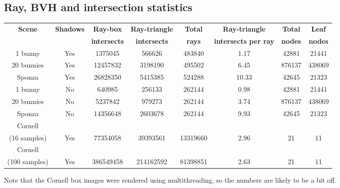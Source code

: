 \documentclass{article} %
\begin{document}
\subsection{Ray, BVH and intersection statistics}
\begin{tabular}{cccccccc}
{\bf Scene} & {\bf Shadows}       & {\bf Ray-box}    & {\bf Ray-triangle}  & {\bf Total} & {\bf Ray-triangle}       & {\bf Total} & {\bf Leaf}\\
            &                     & {\bf intersects} & {\bf intersects}    & {\bf rays}  & {\bf intersects per ray} & {\bf nodes} & {\bf nodes}\\
\hline
1 bunny     & Yes                 & 1375045          & 566626              & 483840      & 1.17                     & 42881       & 21441\\
20 bunnies  & Yes                 & 12457832         & 3198190             & 495502      & 6.45                     & 876137      & 438069\\
Sponza      & Yes                 & 26828350         & 5415385             & 524288      & 10.33                    & 42645       & 21323\\
1 bunny     & No                  & 640985           & 256133              & 262144      & 0.98                     & 42881       & 21441\\
20 bunnies  & No                  & 5237842          & 979273              & 262144      & 3.74                     & 876137      & 438069\\
Sponza      & No                  & 14356648         & 2603678             & 262144      & 9.93                     & 42645       & 21323\\
Cornell\\
(16 samples)& Yes                 & 77354058         & 39393561            & 13319660    & 2.96                     & 21          & 11\\ 
Cornell\\
(100 samples)& Yes                & 386549458        & 214162592           & 81398851    & 2.63                     & 21          & 11\\ 
\end{tabular}

Note that the Cornell box images were rendered using multithreading, so the numbers are likely to be a bit off.
\end{document}

